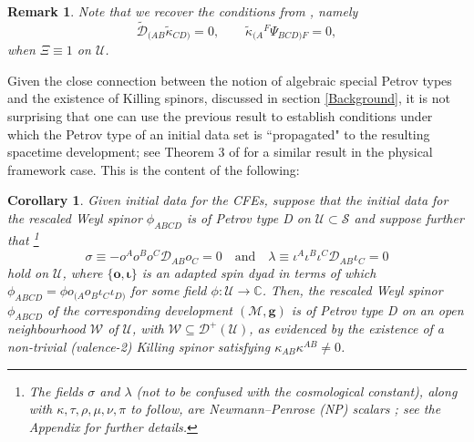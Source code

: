 \documentclass[10pt,a4paper]{article}
\theoremstyle{plain}
\newtheorem{corollary}{Corollary}
\newtheorem{remark}{Remark}
\def\bmg{{\bm g}}
\def\bmo{{\bm o}}
\begin{document}
\begin{remark}{\em 
Note that we recover the conditions from \cite{BaeVal10a}, namely
\[\tilde{\mathcal{D}}_{(AB}\tilde{\kappa}_{CD)}=0, \qquad \tilde{\kappa}_{(A}{}^F
\Psi_{BCD)F}=0, \] when $\Xi\equiv 1$ on $\mathcal{U}$.  }
\end{remark}
Given the close connection between the notion of algebraic special Petrov types
and the existence of Killing spinors, discussed in section
\ref{Background}, it is not surprising that one can use the previous
result to establish conditions under which the Petrov type of an
initial data set is ``propagated" to the resulting spacetime
development; see Theorem 3 of \cite{GarVal08c} for a similar result in
the physical framework case. This is the content of the following:

\begin{corollary}\label{Corollary:PetrovPropagation}
  Given initial data for the CFEs, suppose that the initial data for the rescaled Weyl spinor
  $\phi_{ABCD}$ is of Petrov type D on $\mathcal{U}\subset\mathcal{S}$
  and suppose further that
  \footnote{The fields $\sigma$ and $\lambda$ (not to be confused with
  the cosmological constant), along with $\kappa, \tau, \rho, \mu,
  \nu, \pi$ to follow, are Newmann--Penrose (NP) scalars
  \cite{PenRin84, PenRin86}; see the Appendix for further details.}
\begin{equation} 
\sigma\equiv - o^A o^B o^C\mathcal{D}_{AB}o_C=0 \quad \text{and}\quad
\lambda\equiv
\iota^A\iota^B\iota^C\mathcal{D}_{AB}\iota_C=0\label{ShearConditions}
\end{equation}
hold on $\mathcal{U}$, where $\lbrace \bmo, \bm\iota\rbrace$ is an
adapted spin dyad in terms of which $\phi_{ABCD}=\phi
o_{(A}o_B\iota_C\iota_{D)}$ for some field $\phi:\mathcal{U}\rightarrow\mathbb{C}$.  Then, the rescaled
Weyl spinor $\phi_{ABCD}$ of the corresponding development $(\mathcal{M},\bmg)$ 
is of Petrov type D on an open neighbourhood $\mathcal{W}$ of
$\mathcal{U}$, with $\mathcal{W}\subseteq\mathcal{D}^+(\mathcal{U})$, as evidenced by the
existence of a non-trivial (valence-2) Killing spinor satisfying
$\kappa_{AB}\kappa^{AB}\neq 0$.
\end{corollary}
\end{document}
